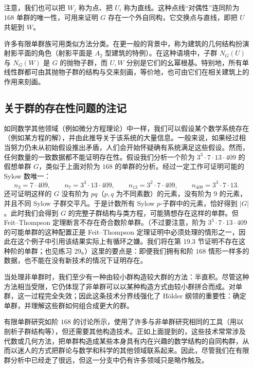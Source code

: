 注意，我们也可以把 $W_j$ 称为点、把 $U_i$ 称为直线。这种点线“对偶性”连同阶为 $168$ 单群的唯一性，可用来证明 $G$ 存在一个外自同构，它交换点与直线，即把 $U$ 共轭到 $W$。

许多有限单群族可用类似方法分类。在更一般的背景中，称为建筑的几何结构扮演射影平面的角色（射影平面是 $A_2$ 型建筑的特例）。在这种语境中，子群 $N_G(U)$ 与 $N_G(W)$ 是 $G$ 的抛物子群，而 $U,W$ 分别是它们的幺幂根基。特别地，所有单线性群都可由其抛物子群的结构与交来刻画，等价地，也可由它们在相关建筑上的作用来刻画。

\subsection*{关于群的存在性问题的注记}

如同数学其他领域（例如微分方程理论）中一样，我们可以假设某个数学系统存在（例如某方程的解），并由此推导关于该系统的大量信息。一般来说，如果经过相当努力仍未从初始假设推出矛盾，人们会开始怀疑确有系统满足这些假设。然而，任何数量的一致数据都不能证明存在性。假设我们分析一个阶为 $3^3\cdot7\cdot13\cdot409$ 的假想单群 $G$，类似于上面对阶为 $168$ 的单群的分析。经过一定工作可证明可能的 Sylow 数唯一：
\[
  n_3=7\cdot409,
  \qquad
  n_7=3^3\cdot13\cdot409,
  \qquad
  n_{13}=3^2\cdot7\cdot409,
  \qquad
  n_{409}=3^3\cdot7\cdot13.
\]
还可证明这样的 $G$ 没有阶为 $pq$（$p,q$ 为不同素数）的元素，没有阶为 $9$ 的元素，并且不同 Sylow 子群交平凡。于是计数所有 Sylow $p$-子群中的元素，恰好得到 $|G|$。此时我们会得到 $G$ 的完整子群结构与类方程，可能猜想存在这样的单群。但 Feit--Thompson 定理断言不存在奇合数阶单群。（不过要注意，阶为 $3^3\cdot7\cdot13\cdot409$ 的可能单群的这种配置正是 Feit--Thompson 定理证明中必须处理的情形之一，因此在这个例子中引用该结果实际上有循环之嫌。我们将在第 19.3 节证明不存在这种阶的单群；也见练习 29。）这里的要点是：即便我们拥有和阶 $168$ 情形一样多的数据，也不能在没有新技术的情况下证明存在。

当处理非单群时，我们至少有一种由较小群构造较大群的方法：半直积。尽管这种方法相当受限，它仍体现了非单群可以以某种构造方式由较小群拼合而成。对单群，这一过程完全失效；因此这条技术分界线强化了 H\"older 纲领的重要性：确定单群，并理解这些群如何组合成更大的群。

有限单群研究如阶 $168$ 的讨论所示，使用了许多与非单群研究相同的工具（用以剖析子群结构等），但还需要其他构造技术。正如上面提到的，这些技术常常涉及代数或几何方法，把单群构造成某些本身具有内在兴趣的数学结构的自同构群，从而以迷人的方式把群论与数学和科学的其他领域联系起来。因此，尽管我们在有限群分析中已经走了很远，但这一分支中仍有许多领域只是略作触及。

